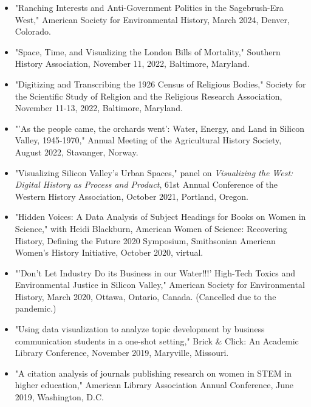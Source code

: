 \documentclass[10pt]{article}
\begin{document}
\begin{itemize}
  \item "Ranching Interests and Anti-Government Politics in the Sagebrush-Era West," American Society for Environmental History, March 2024, Denver, Colorado.
  
  \item "Space, Time, and Visualizing the London Bills of Mortality," Southern History Association, November 11, 2022, Baltimore, Maryland.
  
  \item "Digitizing and Transcribing the 1926 Census of Religious Bodies," Society for the Scientific Study of Religion and the Religious Research Association, November 11-13, 2022, Baltimore, Maryland.
  
  \item "'As the people came, the orchards went': Water, Energy, and Land in Silicon Valley, 1945-1970," Annual Meeting of the Agricultural History Society, August 2022, Stavanger, Norway.
  
  \item "Visualizing Silicon Valley's Urban Spaces," panel on \textit{Visualizing the West: Digital History as Process and Product}, 61st Annual Conference of the Western History Association, October 2021, Portland, Oregon.
  
  \item "Hidden Voices: A Data Analysis of Subject Headings for Books on Women in Science," with Heidi Blackburn, American Women of Science: Recovering History, Defining the Future 2020 Symposium, Smithsonian American Women's History Initiative, October 2020, virtual.
  
  \item "'Don't Let Industry Do its Business in our Water!!!' High-Tech Toxics and Environmental Justice in Silicon Valley," American Society for Environmental History, March 2020, Ottawa, Ontario, Canada. (Cancelled due to the pandemic.)
  
  \item "Using data visualization to analyze topic development by business communication students in a one-shot setting," Brick \& Click: An Academic Library Conference, November 2019, Maryville, Missouri.
  
  \item "A citation analysis of journals publishing research on women in STEM in higher education," American Library Association Annual Conference, June 2019, Washington, D.C.
  

\end{itemize}
\end{document}

